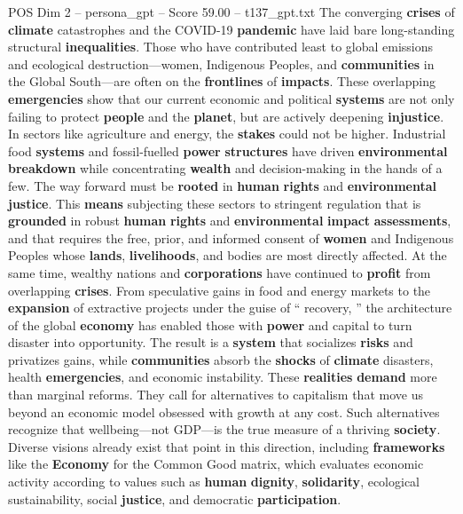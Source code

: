\begin{textsample}{POS Dim 2 – persona\_gpt – Score 59.00 – t137\_gpt.txt}  \label{ex:f2_pos_014}
The converging \textbf{crises} of \textbf{climate} catastrophes and the COVID-19 \textbf{pandemic} have laid bare long-standing structural \textbf{inequalities}.
Those who have contributed least to global emissions and ecological destruction—women, Indigenous Peoples, and \textbf{communities} in the Global South—are often on the \textbf{frontlines} of \textbf{impacts}.
These overlapping \textbf{emergencies} show that our current economic and political \textbf{systems} are not only failing to protect \textbf{people} and the \textbf{planet}, but are actively deepening \textbf{injustice}.
In sectors like agriculture and energy, the \textbf{stakes} could not be higher.
Industrial food \textbf{systems} and fossil-fuelled \textbf{power} \textbf{structures} have driven \textbf{environmental} \textbf{breakdown} while concentrating \textbf{wealth} and decision-making in the hands of a few.
The way forward must be \textbf{rooted} in \textbf{human} \textbf{rights} and \textbf{environmental} \textbf{justice}.
This \textbf{means} subjecting these sectors to stringent regulation that is \textbf{grounded} in robust \textbf{human} \textbf{rights} and \textbf{environmental} \textbf{impact} \textbf{assessments}, and that requires the free, prior, and informed consent of \textbf{women} and Indigenous Peoples whose \textbf{lands}, \textbf{livelihoods}, and bodies are most directly affected.
At the same time, wealthy nations and \textbf{corporations} have continued to \textbf{profit} from overlapping \textbf{crises}.
From speculative gains in food and energy markets to the \textbf{expansion} of extractive projects under the guise of “ recovery, ” the architecture of the global \textbf{economy} has enabled those with \textbf{power} and capital to turn disaster into opportunity.
The result is a \textbf{system} that socializes \textbf{risks} and privatizes gains, while \textbf{communities} absorb the \textbf{shocks} of \textbf{climate} disasters, health \textbf{emergencies}, and economic instability.
These \textbf{realities} \textbf{demand} more than marginal reforms.
They call for alternatives to capitalism that move us beyond an economic model obsessed with growth at any cost.
Such alternatives recognize that wellbeing—not GDP—is the true measure of a thriving \textbf{society}.
Diverse visions already exist that point in this direction, including \textbf{frameworks} like the \textbf{Economy} for the Common Good matrix, which evaluates economic activity according to values such as \textbf{human} \textbf{dignity}, \textbf{solidarity}, ecological sustainability, social \textbf{justice}, and democratic \textbf{participation}.

\end{textsample}
